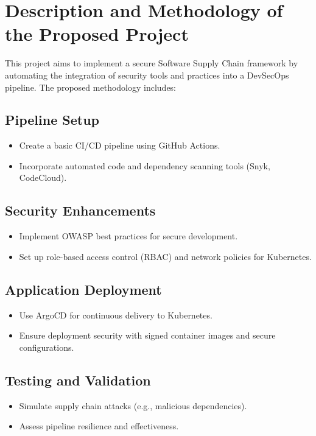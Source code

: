 \documentclass[a4paper,12pt]{article}
\begin{document}
\section{Description and Methodology of the Proposed Project}
This project aims to implement a secure Software Supply Chain framework by automating the integration of security tools and practices into a DevSecOps pipeline. The proposed methodology includes:

\subsection*{Pipeline Setup}
\begin{itemize}
    \item Create a basic CI/CD pipeline using GitHub Actions.
    \item Incorporate automated code and dependency scanning tools (Snyk, CodeCloud).
\end{itemize}

\subsection*{Security Enhancements}
\begin{itemize}
    \item Implement OWASP best practices for secure development.
    \item Set up role-based access control (RBAC) and network policies for Kubernetes.
\end{itemize}

\subsection*{Application Deployment}
\begin{itemize}
    \item Use ArgoCD for continuous delivery to Kubernetes.
    \item Ensure deployment security with signed container images and secure configurations.
\end{itemize}

\subsection*{Testing and Validation}
\begin{itemize}
    \item Simulate supply chain attacks (e.g., malicious dependencies).
    \item Assess pipeline resilience and effectiveness.
\end{itemize}
\end{document}
